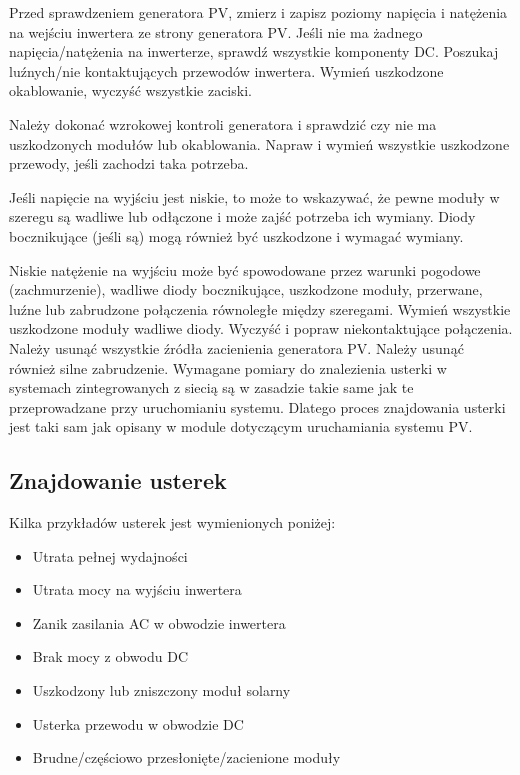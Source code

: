 \documentclass[12pt,a4paper]{article}
\begin{document}
Przed sprawdzeniem generatora PV, zmierz i zapisz poziomy napięcia i 
natężenia na wejściu inwertera ze strony generatora PV. Jeśli nie ma 
żadnego napięcia/natężenia na inwerterze, sprawdź wszystkie komponenty 
DC. Poszukaj luźnych/nie kontaktujących przewodów inwertera. Wymień 
uszkodzone okablowanie, wyczyść wszystkie zaciski. 

Należy dokonać wzrokowej kontroli generatora i sprawdzić czy nie ma 
uszkodzonych modułów lub okablowania. Napraw i wymień wszystkie 
uszkodzone przewody, jeśli zachodzi taka potrzeba. 

Jeśli napięcie na wyjściu jest niskie, to może to wskazywać, że pewne 
moduły w szeregu są wadliwe lub odłączone i może zajść potrzeba ich 
wymiany. Diody bocznikujące (jeśli są) mogą również być uszkodzone i 
wymagać wymiany. 

Niskie natężenie na wyjściu może być spowodowane przez warunki pogodowe 
(zachmurzenie), wadliwe diody bocznikujące, uszkodzone moduły, 
przerwane, luźne lub zabrudzone połączenia równoległe między szeregami. 
Wymień wszystkie uszkodzone moduły wadliwe diody. Wyczyść i popraw 
niekontaktujące połączenia. Należy usunąć wszystkie źródła zacienienia 
generatora PV. Należy usunąć również silne zabrudzenie. Wymagane pomiary 
do znalezienia usterki w systemach zintegrowanych z siecią są w zasadzie 
takie same jak te przeprowadzane przy uruchomianiu systemu. Dlatego 
proces znajdowania usterki jest taki sam jak opisany w module dotyczącym 
uruchamiania systemu PV. 


\subsection{Znajdowanie usterek}


Kilka przykładów usterek jest wymienionych poniżej: 

\begin{itemize}
\item Utrata pełnej wydajności 
\item Utrata mocy na wyjściu inwertera 
\item Zanik zasilania AC w obwodzie inwertera 
\item Brak mocy z obwodu DC 
\item Uszkodzony lub zniszczony moduł solarny 
\item Usterka przewodu w obwodzie DC 
\item Brudne/częściowo przesłonięte/zacienione moduły 
\end{itemize}
 
\end{document}
